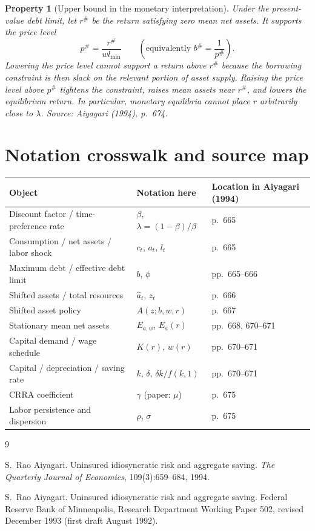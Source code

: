 \documentclass[11pt]{article}
\theoremstyle{propertystyle}
\newtheorem{property}{Property}
\newcommand{\1}{\mathbf{1}}
\begin{document}
\begin{property}[Upper bound in the monetary interpretation]
Under the present-value debt limit, let $r^{\#}$ be the return satisfying zero
mean net assets.  It supports the price level
\[
  p^{\#}=\frac{r^{\#}}{wl_{\min}}
  \qquad\left(\text{equivalently }b^{\#}=\frac1{p^{\#}}\right).
\]
Lowering the price level cannot support a return above $r^{\#}$ because the
borrowing constraint is then slack on the relevant portion of asset supply.
Raising the price level above $p^{\#}$ tightens the constraint, raises mean
assets near $r^{\#}$, and lowers the equilibrium return.  In particular,
monetary equilibria cannot place $r$ arbitrarily close to $\lambda$.
\emph{Source: Aiyagari (1994), p.~674.}
\end{property}

\section{Notation crosswalk and source map}

\begin{center}
\small
\begin{tabular}{@{}lll@{}}
\toprule
Object & Notation here & Location in Aiyagari (1994) \\
\midrule
Discount factor / time-preference rate & $\beta$, $\lambda=(1-\beta)/\beta$ & p.~665 \\
Consumption / net assets / labor shock & $c_t$, $a_t$, $l_t$ & p.~665 \\
Maximum debt / effective debt limit & $b$, $\phi$ & pp.~665--666 \\
Shifted assets / total resources & $\widehat a_t$, $z_t$ & p.~666 \\
Shifted asset policy & $A(z;b,w,r)$ & p.~667 \\
Stationary mean net assets & $E_{a,w}$, $E_a(r)$ & pp.~668, 670--671 \\
Capital demand / wage schedule & $K(r)$, $w(r)$ & pp.~670--671 \\
Capital / depreciation / saving rate & $k$, $\delta$, $\delta k/f(k,1)$ & pp.~670--671 \\
CRRA coefficient & $\gamma$ (paper: $\mu$) & p.~675 \\
Labor persistence and dispersion & $\rho$, $\sigma$ & p.~675 \\
\bottomrule
\end{tabular}
\end{center}

\begin{thebibliography}{9}

S.~Rao Aiyagari.
\newblock Uninsured idiosyncratic risk and aggregate saving.
\newblock \emph{The Quarterly Journal of Economics}, 109(3):659--684, 1994.

S.~Rao Aiyagari.
\newblock Uninsured idiosyncratic risk and aggregate saving.
\newblock Federal Reserve Bank of Minneapolis, Research Department Working
  Paper 502, revised December 1993 (first draft August 1992).

\end{thebibliography}
\end{document}

